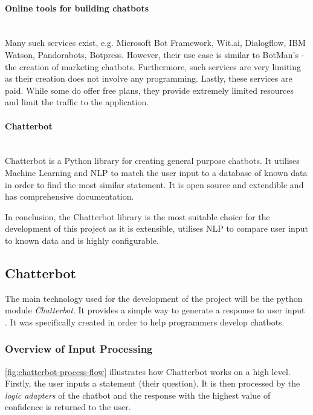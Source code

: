 \documentclass[12pt,a4paper]{article}
\newcommand{\myparagraph}[1]{\paragraph{#1}\mbox{}\\}
\begin{document}
\myparagraph{Online tools for building chatbots}
Many such services exist, e.g. Microsoft Bot Framework, Wit.ai, Dialogflow, IBM Watson, Pandorabots, Botpress. However, their use case is similar to BotMan's - the creation of marketing chatbots. Furthermore, such services are very limiting as their creation does not involve any programming. Lastly, these services are paid. While some do offer free plans, they provide extremely limited resources and limit the traffic to the application.

\myparagraph{Chatterbot}
Chatterbot is a Python library for creating general purpose chatbots. It utilises Machine Learning and NLP to match the user input to a database of known data in order to find the most similar statement. It is open source and extendible and has comprehensive documentation. 

In conclusion, the Chatterbot library is the most suitable choice for the development of this project as it is extensible, utilises NLP to compare user input to known data and is highly configurable.

\subsection{Chatterbot}
The main technology used for the development of the project will be the python module \textit{Chatterbot}. It provides a simple way to generate a response to user input \citep{Chatterbot:online}. It was specifically created in order to help programmers develop chatbots.

\subsubsection{Overview of Input Processing}
\cref{fig:chatterbot-process-flow} illustrates how Chatterbot works on a high level. Firstly, the user inputs a statement (their question). It is then processed by the \textit{logic adapters} of the chatbot and the response with the highest value of confidence is returned to the user.
\end{document}

